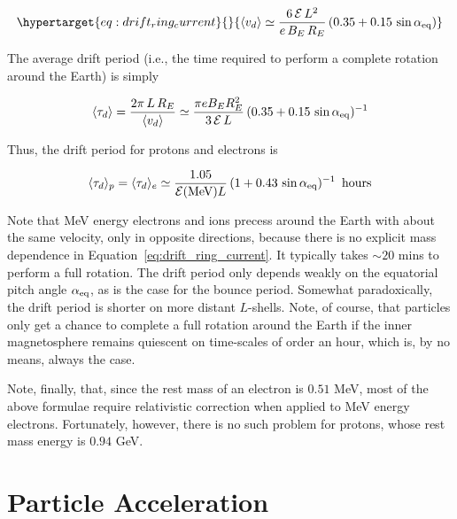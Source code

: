 \documentclass[
  notoc %
]{tufte-book}
\begin{document}
\begin{equation}\protect\hypertarget{eq:drift_ring_current}{}{
\langle v_d\rangle \simeq \frac{6\,{\cal E}\,L^2}{e\,B_E\,R_E} \,(0.35 + 0.15\,\sin\alpha_{\rm eq})
}\label{eq:drift_ring_current}\end{equation}

The average drift period (i.e., the time required to perform a complete
rotation around the Earth) is simply

\[
\langle \tau_d\rangle = \frac{2\pi\,L\,R_E}{\langle v_d\rangle}\simeq\frac{\pi e B_E R_E^2}{3\,{\cal E}\,L}\,(0.35 + 0.15\,\sin\alpha_{\rm eq})^{-1}
\]

Thus, the drift period for protons and electrons is

\[
\langle \tau_d\rangle_p=\langle \tau_d\rangle_e \simeq \frac{1.05}{{\cal E}(\text{MeV})L}\,(1+0.43\,\sin\alpha_{\rm eq})^{-1}\,\,\,{\rm hours}
\]

Note that MeV energy electrons and ions precess around the Earth with
about the same velocity, only in opposite directions, because there is
no explicit mass dependence in Equation~\ref{eq:drift_ring_current}. It
typically takes \(\sim 20\) mins to perform a full rotation. The drift
period only depends weakly on the equatorial pitch angle
\(\alpha_{\rm eq}\), as is the case for the bounce period. Somewhat
paradoxically, the drift period is shorter on more distant \(L\)-shells.
Note, of course, that particles only get a chance to complete a full
rotation around the Earth if the inner magnetosphere remains quiescent
on time-scales of order an hour, which is, by no means, always the case.

Note, finally, that, since the rest mass of an electron is \(0.51\) MeV,
most of the above formulae require relativistic correction when applied
to MeV energy electrons. Fortunately, however, there is no such problem
for protons, whose rest mass energy is \(0.94\) GeV.

\hypertarget{particle-acceleration}{%
\section{Particle Acceleration}\label{particle-acceleration}}
\end{document}
